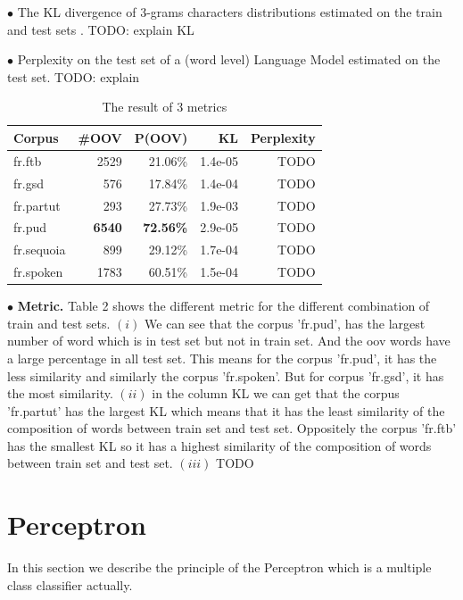 \documentclass{article}
\begin{document}
$\bullet$ The KL divergence of 3-grams characters distributions estimated on the train and test sets \cite{alonso2016noisy}. TODO: explain KL

$\bullet$ Perplexity on the test set of a (word level) Language Model estimated on the test set. TODO: explain

\begin{table}[h]
    \caption{The result of 3 metrics}
    \vspace{5pt}
    \centering
    
\begin{tabular}{|l|rr|r|r|}
\hline
Corpus & \#OOV & P(OOV) & KL & Perplexity\\
\hline
fr.ftb     & 2529 & 21.06\% & 1.4e-05 & TODO \\
fr.gsd     & 576 & 17.84\% & 1.4e-04  & TODO\\
fr.partut  & 293   & 27.73\%  & 1.9e-03  & TODO\\
fr.pud     & \textbf{6540}   & \textbf{72.56\%}  & 2.9e-05 & TODO\\
fr.sequoia & 899  & 29.12\%  &  1.7e-04 & TODO\\
fr.spoken  & 1783  & 60.51\%  & 1.5e-04  &TODO \\
\hline
\end{tabular}
\label{table_matric}
\end{table}

$\bullet$ \textbf{Metric.} Table 2 shows the different metric for the different combination of train and test sets. $(i)$ We can see that the corpus 'fr.pud', has the largest number of word which is in test set but not in train set. And the oov words have a large percentage in all test set. This means for the corpus 'fr.pud', it has the less similarity and similarly the corpus 'fr.spoken'. But for corpus 'fr.gsd', it has the most similarity. $(ii)$ in the column KL we can get that the corpus 'fr.partut' has the largest KL which means that it has the least similarity of the composition of words between train set and test set. Oppositely the corpus 'fr.ftb' has the smallest KL so it has a highest similarity of the composition of words between train set and test set. $(iii)$ TODO



\section{Perceptron}
In this section we describe the principle of the Perceptron which is a multiple class classifier actually.
\end{document}
